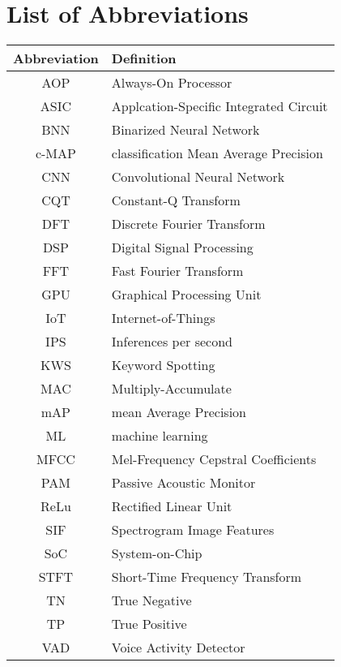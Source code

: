 \chapter*{List of Abbreviations}
\thispagestyle{empty}

\vspace{0.5cm}

\begin{longtable}{|c|l|} 
 \hline
  \textbf{Abbreviation} & \textbf{Definition} \\ \hline
    AOP & Always-On Processor \\ \hline
    ASIC & Applcation-Specific Integrated Circuit \\ \hline
    BNN & Binarized Neural Network \\ \hline
    c-MAP & classification Mean Average Precision \\ \hline
    CNN & Convolutional Neural Network \\ \hline
    CQT & Constant-Q Transform \\ \hline
    DFT & Discrete Fourier Transform \\ \hline
    DSP & Digital Signal Processing \\ \hline
    FFT & Fast Fourier Transform \\ \hline
    GPU & Graphical Processing Unit \\ \hline
    IoT & Internet-of-Things \\ \hline
    IPS & Inferences per second \\ \hline
    KWS & Keyword Spotting \\ \hline
    MAC & Multiply-Accumulate \\ \hline
    mAP & mean Average Precision \\ \hline
    ML & machine learning \\ \hline
    MFCC & Mel-Frequency Cepstral Coefficients \\ \hline
    PAM & Passive Acoustic Monitor \\ \hline
    ReLu & Rectified Linear Unit \\ \hline
    SIF & Spectrogram Image Features \\ \hline
    SoC & System-on-Chip \\ \hline
    STFT & Short-Time Frequency Transform \\ \hline
    TN & True Negative \\ \hline
    TP & True Positive \\ \hline
    VAD & Voice Activity Detector \\ \hline
\end{longtable}